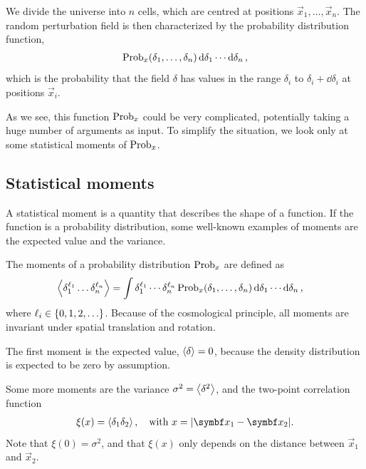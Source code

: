 We divide the universe into $n$ cells, which are centred at positions $\vec{x}_1, \dots, \vec{x}_n$. The random perturbation field is then characterized by the probability distribution function,
\begin{align*}
	\operatorname{Prob}_x(\delta_1, \dots, \delta_n) \dd{\delta_1} \cdots \dd{\delta_n},
\end{align*}
which is the probability that the field $\delta$ has values in the range $\delta_i$ to $\delta_i + \dd{\delta_i}$ at positions $\vec{x}_i$.

As we see, this function $\operatorname{Prob}_x$ could be very complicated, potentially taking a huge number of arguments as input. To simplify the situation, we look only at some statistical moments of $\operatorname{Prob}_x$.

\subsection{Statistical moments}
A statistical moment is a quantity that describes the shape of a function. If the function is a probability distribution, some well-known examples of moments are the expected value and the variance.

The moments of a probability distribution $\operatorname{Prob}_x$ are defined as
\begin{align*}
	\left\langle \delta_1^{\ell_1} \dots \delta_n^{\ell_n} \right\rangle
	&= \int \delta_1^{\ell_1} \cdots \delta_n^{\ell_n}
	\operatorname{Prob}_x(\delta_1, \dots, \delta_n) \dd{\delta_1} \cdots \dd{\delta_n},
\end{align*}
where $\ell_i \in \left\{ {0, 1, 2, \dots} \right\}$. Because of the cosmological principle, all moments are invariant under spatial translation and rotation.

The first moment is the expected value, $\left\langle \delta \right\rangle = 0$, because the density distribution is expected to be zero by assumption.

Some more moments are the variance $\sigma^2 = \left\langle \delta^2 \right\rangle$, and the two-point correlation function
\begin{align*}
	\xi(x) = \moment{\delta_1 \delta_2}, \quad \text{with } x = \abs{\vec{x}_1 - \vec{x}_2}.
\end{align*}
Note that $\xi(0) = \sigma^2$, and that $\xi(x)$ only depends on the distance between $\vec{x}_1$ and $\vec{x}_2$.

